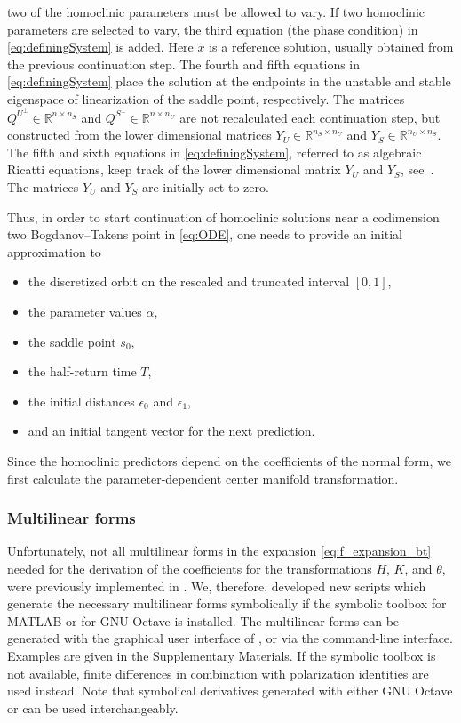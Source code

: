 two of the homoclinic parameters must be allowed to vary. If two homoclinic
parameters are selected to vary, the third equation (the phase condition) in
\cref{eq:definingSystem} is added. Here $\tilde x$ is a reference solution,
usually obtained from the previous continuation step. The fourth and fifth
equations in \cref{eq:definingSystem} place the solution at the endpoints in
the unstable and stable eigenspace of linearization of the saddle point,
respectively. The matrices $Q^{U^{\perp}} \in \mathbb{R}^{n \times n_{S}}$ and
$Q^{S^{\perp}} \in \mathbb{R}^{n \times n_{U}}$ are not recalculated each
continuation step, but constructed from the lower dimensional matrices $Y_{U}
\in \mathbb{R}^{n_{S} \times n_{U}}$ and $Y_{S} \in \mathbb{R}^{n_{U} \times
n_{S}}$. The fifth and sixth equations in \cref{eq:definingSystem}, referred to
as algebraic Ricatti equations, keep track of the lower dimensional matrix
$Y_U$ and $Y_S$, see~\cite{Friedman2001Continuation}. The matrices $Y_U$ and
$Y_S$ are initially set to zero.

Thus, in order to start continuation of homoclinic solutions near a codimension
two Bogdanov--Takens point in \cref{eq:ODE}, one needs to provide an initial
approximation to
\begin{itemize}
    \item the discretized orbit on the rescaled and truncated interval $[0,1]$,
    \item the parameter values $\alpha$,
    \item the saddle point $s_0$,
    \item the half-return time $T$,
    \item the initial distances $\epsilon_0$ and $\epsilon_1$,
    \item and an initial tangent vector for the next prediction.
\end{itemize}

Since the homoclinic predictors depend on the coefficients of the normal form,
we first calculate the parameter-dependent center manifold transformation.

\subsubsection{Multilinear forms}
Unfortunately, not all multilinear forms in the expansion
\cref{eq:f_expansion_bt} needed for the derivation of the coefficients for the
transformations $H$, $K$, and $\theta$, were previously implemented in \MATCONT.  We,
therefore, developed new scripts which generate the necessary multilinear
forms symbolically if the symbolic toolbox for MATLAB or for GNU Octave is
installed.  The multilinear forms can be generated with the graphical user
interface of \MATCONT, or via the command-line interface.  Examples are given in
the Supplementary Materials.  If the symbolic toolbox is not
available, finite differences in combination with polarization identities are
used instead.  Note that symbolical derivatives generated with either GNU
Octave or \MATCONT can be used interchangeably.

